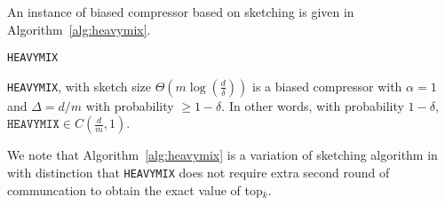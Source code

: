 An instance of biased compressor based on sketching is given in Algorithm~\ref{alg:heavymix}.
\begin{algorithm}[H]
\caption{\texttt{HEAVYMIX}  }\label{alg:heavymix}
\begin{algorithmic}[1]
\end{algorithmic}
\end{algorithm}


\begin{lemma}
\texttt{HEAVYMIX}, with sketch size $\Theta\left(m\log\left(\frac{d}{\delta}\right)\right)$ is a biased compressor with $\alpha=1$ and  $\Delta=d/m$ with probability $\geq1-\delta$. In other words, with probability $1-\delta$, $\texttt{HEAVYMIX}\in C(\frac{d}{m},1)$. 
\end{lemma}

We note that Algorithm~\ref{alg:heavymix} is a variation of sketching algorithm in~\cite{ivkin2019communication}
with distinction that \texttt{HEAVYMIX} does not require extra second round of communcation to obtain the exact value of top$_k$. 

